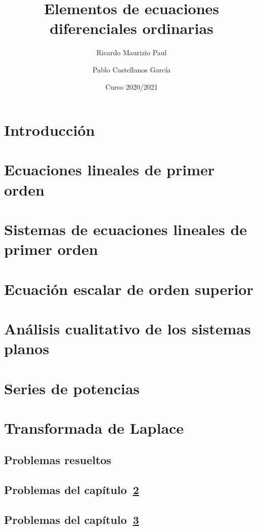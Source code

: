 \documentclass[a4paper]{book}
\title{Elementos de ecuaciones diferenciales ordinarias}
\author{Ricardo Maurizio Paul \and Pablo Castellanos García}
\date{Curso 2020/2021}
\begin{document}
\maketitle
\tableofcontents

\setcounter{chapter}{-1}
\chapter{Introducción}


\chapter{Ecuaciones lineales de primer orden}
\label{chap:capitulo1}


\chapter{Sistemas de ecuaciones lineales de primer orden}
\label{chap:capitulo2}



\chapter{Ecuación escalar de orden superior}
\label{chap:capitulo3}


\chapter{Análisis cualitativo de los sistemas planos}
\label{chap:capitulo4}


\chapter{Series de potencias}
\label{chap:capitulo5}


\chapter{Transformada de Laplace}
\label{chap:capitulo6}


\begin{appendices}

\chapter{Problemas resueltos}

\section[Problemas del capítulo 1]{Problemas del capítulo~\ref{chap:capitulo1}}


\section[Problemas del capítulo 2]{Problemas del capítulo~\ref{chap:capitulo2}}


\end{appendices}
\end{document}
